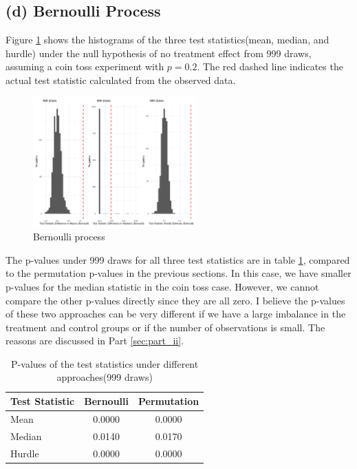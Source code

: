 \documentclass[11pt]{article}
\numberwithin{equation}{section}
\begin{document}
\subsection*{(d) Bernoulli Process}


Figure \ref{fig:bernoulli} shows the histograms of the three test statistics(mean, median, and hurdle) under the null hypothesis of no treatment effect from 999 draws, assuming a coin toss experiment with $p=0.2$.
The red dashed line indicates the actual test statistic calculated from the observed data. 

\begin{figure}[h]
    \centering
    \includegraphics[width=\textwidth, height=5cm]{output/histograms_bernoulli.png}
    \caption{\label{fig:bernoulli}Bernoulli process}
\end{figure}


The p-values under 999 draws for all three test statistics are in table \ref{tab:p_values_bernoulli}, compared to the permutation p-values in the previous sections.
In this case, we have smaller p-values for the median statistic in the coin toss case. However, we cannot compare 
the other p-values directly since they are all zero. I believe the p-values of these two approaches can be very different if we have a large imbalance in the treatment and control groups or if the number of observations is small.
The reasons are discussed in Part \ref{sec:part_ii}.

\begin{table}[h]
    \centering
    \begin{tabular}{lcc}
        \toprule
        Test Statistic & Bernoulli & Permutation \\
        \midrule
        Mean & 0.0000 & 0.0000 \\
        Median & 0.0140 & 0.0170 \\
        Hurdle & 0.0000 & 0.0000 \\
        \bottomrule
    \end{tabular}
    \caption{\label{tab:p_values_bernoulli}P-values of the test statistics under different approaches(999 draws)}
\end{table}
\end{document}
